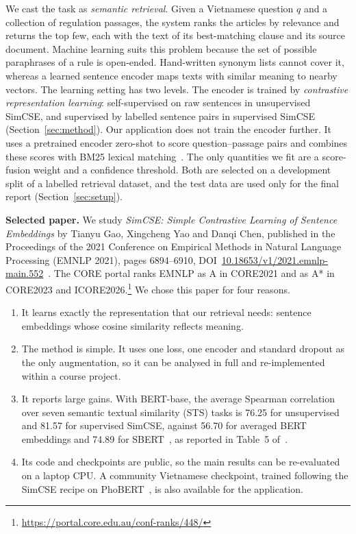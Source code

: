 We cast the task as \emph{semantic retrieval}. Given a Vietnamese question $q$
and a collection of regulation passages, the system ranks the articles by
relevance and returns the top few, each with the text of its best-matching
clause and its source document.
Machine learning suits this problem because the set of possible paraphrases of
a rule is open-ended. Hand-written synonym lists cannot cover it, whereas a
learned sentence encoder maps texts with similar meaning to nearby vectors.
The learning setting has two levels. The encoder is trained by
\emph{contrastive representation learning}: self-supervised on raw sentences in
unsupervised SimCSE, and supervised by labelled sentence pairs in supervised
SimCSE (Section~\ref{sec:method}). Our application does not train the encoder
further. It uses a pretrained encoder zero-shot to score question--passage
pairs and combines these scores with BM25 lexical matching~\cite{Robertson_2009}.
The only quantities we fit are a score-fusion weight and a confidence
threshold. Both are selected on a development split of a labelled retrieval
dataset, and the test data are used only for the final report
(Section~\ref{sec:setup}).

\textbf{Selected paper.} We study \emph{SimCSE: Simple Contrastive Learning of
Sentence Embeddings} by Tianyu Gao, Xingcheng Yao and Danqi Chen, published in
the Proceedings of the 2021 Conference on Empirical Methods in Natural Language
Processing (EMNLP 2021), pages 6894--6910,
DOI~\url{10.18653/v1/2021.emnlp-main.552}~\cite{gao-etal-2021-simcse}.
The CORE portal ranks EMNLP as A in CORE2021 and as A* in CORE2023 and
ICORE2026.\footnote{\url{https://portal.core.edu.au/conf-ranks/448/}}
We chose this paper for four reasons.
\begin{enumerate}
\item It learns exactly the representation that our retrieval needs: sentence
embeddings whose cosine similarity reflects meaning.
\item The method is simple. It uses one loss, one encoder and standard dropout
as the only augmentation, so it can be analysed in full and re-implemented
within a course project.
\item It reports large gains. With BERT-base, the average Spearman correlation
over seven semantic textual similarity (STS) tasks is 76.25 for unsupervised
and 81.57 for supervised SimCSE, against 56.70 for averaged BERT embeddings and
74.89 for SBERT~\cite{reimers-gurevych-2019-sentence}, as reported in Table~5
of~\cite{gao-etal-2021-simcse}.
\item Its code and checkpoints are public, so the main results can be
re-evaluated on a laptop CPU. A community Vietnamese checkpoint, trained
following the SimCSE recipe on PhoBERT~\cite{nguyen-tuan-nguyen-2020-phobert},
is also available for the application.
\end{enumerate}

